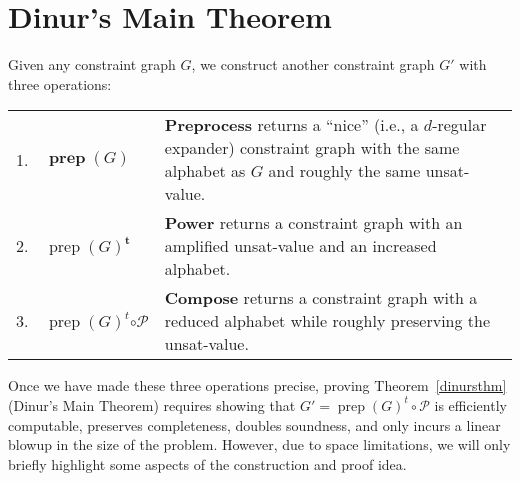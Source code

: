 \documentclass{article}
\newcommand{\N}{{\mathbf N}}
\newcommand{\UNSAT}{\mathsf{UNSAT}}
\newcommand{\prep}{{\operatorname{prep}}}
\begin{document}

\section{Dinur's Main Theorem}\label{proof}

%

Given any constraint graph $G$,
we construct another constraint graph $G'$
with three operations:
\begin{center}
\begin{tabular}{l l p{10cm}}
1. & $\boldsymbol{\prep}(G)$ & \textbf{Preprocess} returns a ``nice'' (i.e., a $d$-regular expander)
       constraint graph with the same alphabet as $G$ and roughly the same unsat-value.\\
2. & $\prep(G)^{\boldsymbol{t}}$ & \textbf{Power} returns a constraint graph with an amplified
                    unsat-value and an increased alphabet. \\
3. & $\prep(G)^t \boldsymbol{\circ \mathcal{P}}$ & \textbf{Compose} returns a constraint graph with a reduced alphabet while roughly
                   preserving the unsat-value.
\end{tabular}
\end{center}
Once we have made these three operations precise,
proving Theorem~\ref{dinursthm} (Dinur's Main Theorem)
requires showing that $G' = \prep(G)^t \circ \mathcal{P}$ is efficiently
computable, preserves completeness, doubles soundness, and only
incurs a linear blowup in the size of the problem.
However, due to space limitations, we will only briefly highlight some
aspects of the construction and proof idea.
\end{document}

